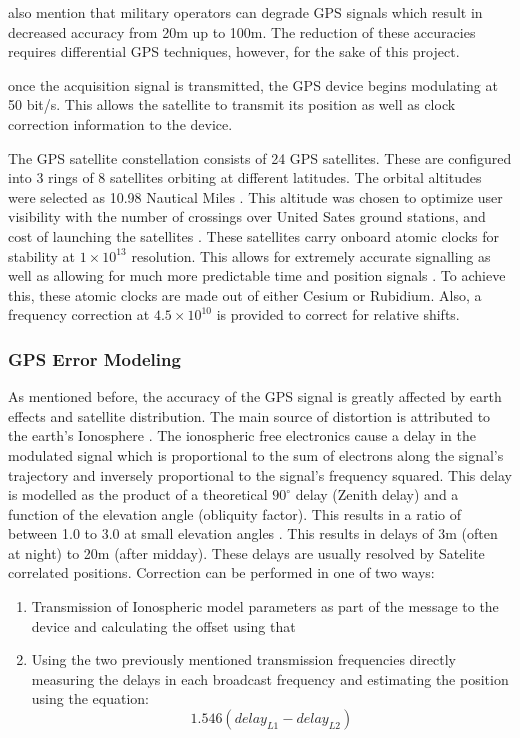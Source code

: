 \textcite{spilker1996global} also mention that military operators can degrade GPS signals which result in decreased accuracy from 20m up to 100m. The reduction of these accuracies requires differential GPS techniques, however, for the sake of this project. \par
once the acquisition signal is transmitted, the GPS device begins modulating at 50 bit/s. This allows the satellite to transmit its position as well as clock correction information to the device.\par
The GPS satellite constellation consists of 24 GPS satellites. These are configured into 3 rings of 8 satellites orbiting at different latitudes. The orbital altitudes were selected as 10.98 Nautical Miles \cite{spilker1996global}. This altitude was chosen to optimize user visibility with the number of crossings over United Sates ground stations, and cost of launching the satellites \cite{spilker1996global}. These satellites carry onboard atomic clocks for stability at $1\times10^{13}$ resolution. This allows for extremely accurate signalling as well as allowing for much more predictable time and position signals \cite{spilker1996global}. To achieve this, these atomic clocks are made out of either Cesium or Rubidium. Also, a frequency correction at $4.5\times10^{10}$ is provided to correct for relative shifts. \par
\subsubsection{GPS Error Modeling}
As mentioned before, the accuracy of the GPS signal is greatly affected by earth effects and satellite distribution. The main source of distortion is attributed to the earth's Ionosphere \cite{spilker1996global}. The ionospheric free electronics cause a delay in the modulated signal which is proportional to the sum of electrons along the signal's trajectory and inversely proportional to the signal's frequency squared. This delay is modelled as the product of a theoretical $90^\circ$ delay (Zenith delay) and a function of the elevation angle (obliquity factor). This results in a ratio of between 1.0 to 3.0 at small elevation angles \cite{spilker1996global}. This results in delays of 3m (often at night) to 20m (after midday). These delays are usually resolved by Satelite correlated positions. Correction can be performed in one of two ways:
\begin{enumerate}
	\item Transmission of Ionospheric model parameters as part of the message to the device and calculating the offset using that
	\item Using the two previously mentioned transmission frequencies directly measuring the delays in each broadcast frequency and estimating the position using the equation:\cite{spilker1996global}
	\begin{equation}
		1.546(delay_{L1} - delay_{L2})
	\end{equation}
\end{enumerate}

